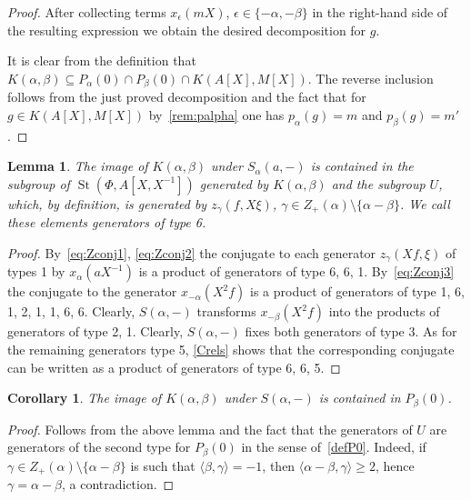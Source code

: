 \documentclass[oneside, 8pt]{amsart}
\newtheorem{corollary}{Corollary}
\newtheorem{lemma}{Lemma}
\theoremstyle{remark}
\theoremstyle{definition}
\DeclareMathOperator{\St}{St}
\numberwithin{equation}{section}
\begin{document}
\begin{proof}
 After collecting terms $x_\epsilon(mX)$, $\epsilon \in \{ -\alpha, -\beta \}$ in the right-hand side of the resulting expression
 we obtain the desired decomposition for $g$.
 
 It is clear from the definition that $K(\alpha, \beta) \subseteq P_\alpha(0) \cap P_\beta(0) \cap K(A[X], M[X])$. The reverse inclusion follows from the just proved decomposition and the fact that for $g\in K(A[X], M[X])$ by~\cref{rem:palpha} one has $p_{\alpha}(g) = m$ and $p_\beta(g) = m'$. \end{proof}
  
\begin{lemma} The image of $K(\alpha, \beta)$ under $S_{\alpha}(a, -)$ is contained in the subgroup of $\St(\Phi, A[X, X^{-1}])$ 
 generated by $K(\alpha, \beta)$ and the subgroup $U$, which, by definition, is generated by $z_\gamma(f, X\xi)$, $\gamma \in Z_+(\alpha) \setminus \{ \alpha - \beta \}$. We call these elements generators of type 6.
\end{lemma}
\begin{proof} By~\eqref{eq:Zconj1}, \eqref{eq:Zconj2} the conjugate to each generator $z_\gamma(Xf, \xi)$ of types 1 by $x_\alpha(aX^{-1})$ is a product of generators of type 6, 6, 1.
By~\eqref{eq:Zconj3} the conjugate to the generator $x_{-\alpha}(X^2f)$ is a product of generators of type 1, 6, 1, 2, 1, 1, 6, 6.
Clearly, $S(\alpha, -)$ transforms $x_{-\beta}(X^2f)$ into the products of generators of type 2, 1.
Clearly, $S(\alpha, -)$ fixes both generators of type 3. 
As for the remaining generators type 5, \cref{Crels} shows that the corresponding conjugate can be written as a product of generators of type 6, 6, 5. \end{proof}  

\begin{corollary} The image of $K(\alpha, \beta)$ under $S(\alpha, -)$ is contained in $P_\beta(0)$. \end{corollary}
\begin{proof} Follows from the above lemma and the fact that the generators of $U$ are generators of the second type for $P_\beta(0)$ in the sense of~\cref{defP0}.
 Indeed, if $\gamma \in Z_+(\alpha) \setminus \{ \alpha - \beta \}$ is such that $\langle \beta, \gamma \rangle = -1$, then $ \langle \alpha - \beta, \gamma \rangle \geq 2$, hence
  $\gamma = \alpha - \beta$, a contradiction. \end{proof}
\end{document}
